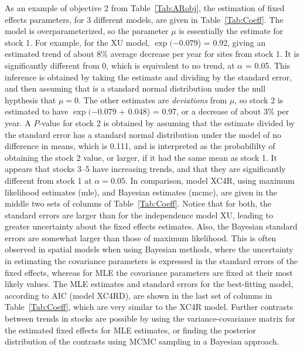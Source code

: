 \documentclass[11pt, titlepage]{article}\usepackage[]{graphicx}\usepackage[]{color}
\begin{document}
As an example of objective 2 from Table~\ref{Tab:ARobj}, the estimation of fixed effects parameters, for 3 different models, are given in Table~\ref{Tab:Coeff}.  The model is overparameterized, so the parameter $\mu$ is essentially the estimate for stock 1. For example, for the XU model, $\exp($\ensuremath{-0.079}) = 0.92, giving an estimated trend of about 8\% average decrease per year for sites from stock 1. It is significantly different from 0, which is equivalent to no trend, at $\alpha$ = 0.05. This inference is obtained by taking the estimate and dividing by the standard error, and then assuming that is a standard normal distribution under the null hypthesis that $\mu = 0$. The other estimates are \emph{deviations} from $\mu$, so stock 2 is estimated to have $\exp($\ensuremath{-0.079} + 0.048) = 0.97, or a decrease of about 3\% per year.  A $P$-value for stock 2 is obtained by assuming that the estimate divided by the standard error has a standard normal distribution under the model of no difference in means, which is 0.111, and is interpreted as the probabililty of obtaining the stock 2 value, or larger, if it had the same mean as stock 1.  It appears that stocks 3--5 have increasing trends, and that they are significantly different from stock 1 at $\alpha = 0.05$.  In comparison, model XC4R, using maximum likelihood estimates (mle), and Bayesian estimates (mcmc), are given in the middle two sets of columns of Table~\ref{Tab:Coeff}.  Notice that for both, the standard errors are larger than for the independence model XU, leading to greater uncertainty about the fixed effects estimates.  Also, the Bayesian standard errors are somewhat larger than those of maximum likelihood.  This is often observed in spatial models when using Bayesian methods, where the uncertainty in estimating the covariance parameters is expressed in the standard errors of the fixed effects, whereas for MLE the covariance parameters are fixed at their most likely values.  The MLE estimates and standard errors for the best-fitting model, according to AIC (model XC4RD), are shown in the last set of columns in Table~\ref{Tab:Coeff}, which are very similar to the XC4R model.  Further contrasts between trends in stocks are possible by using the variance-covariance matrix for the estimated fixed effects for MLE estimates, or finding the posterior distribution of the contrasts using MCMC sampling in a Bayesian approach.
\end{document}
